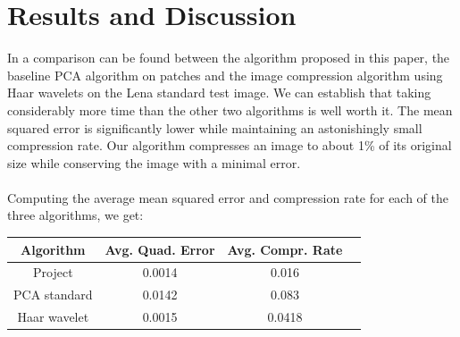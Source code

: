\documentclass[10pt,conference,compsocconf]{IEEEtran}
\begin{document}
\section{Results and Discussion}
In  a comparison can be found between the algorithm proposed in this paper, the baseline PCA algorithm on patches and the image compression algorithm using Haar wavelets on the Lena standard test image. We can establish that taking considerably more time than the other two algorithms is well worth it. The mean squared error is significantly lower while maintaining an astonishingly small compression rate. Our algorithm compresses an image to about 1\% of its original size while conserving the image with a minimal error.
\\
\\
Computing the average mean squared error and compression rate for each of the three algorithms, we get:
\begin{table}[h!]
\begin{center}
 \begin{tabular}{||c c c c||} 
 \hline
 Algorithm & Avg. Quad. Error & Avg. Compr. Rate\\ [0.5ex] 
 \hline\hline
 Project & 0.0014 & 0.016\\ 
 \hline
 PCA standard & 0.0142 & 0.083\\
 \hline
 Haar wavelet & 0.0015 & 0.0418\\
 \hline
\end{tabular}
\end{center}
\end{table}
\\
\\
\end{document}
